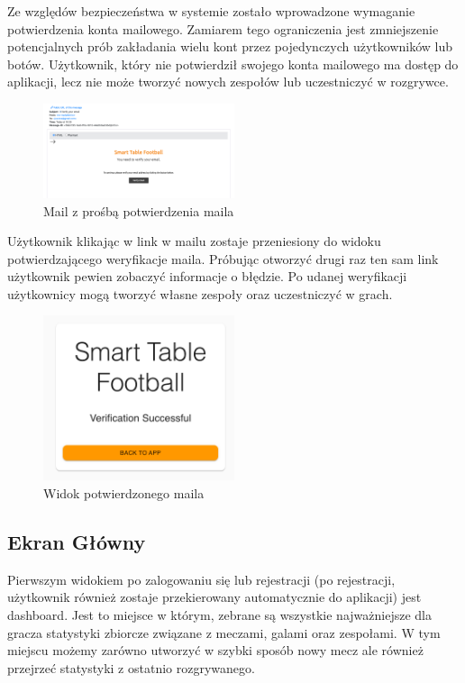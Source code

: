 Ze względów bezpieczeństwa w systemie zostało wprowadzone wymaganie potwierdzenia konta mailowego. Zamiarem tego ograniczenia jest zmniejszenie potencjalnych prób zakładania wielu kont przez pojedynczych użytkowników lub botów. Użytkownik, który nie potwierdził swojego konta mailowego ma dostęp do aplikacji, lecz nie może tworzyć nowych zespołów lub uczestniczyć w rozgrywce.

\begin{figure}[h!]
  \centering
    \includegraphics[width=0.5\textwidth]{images/api/verify_email.png}
  \caption{Mail z prośbą potwierdzenia maila}
  \label{fig:mobile}
\end{figure}

Użytkownik klikając w link w mailu zostaje przeniesiony do widoku potwierdzającego weryfikacje maila. Próbując otworzyć drugi raz ten sam link użytkownik pewien zobaczyć informacje o błędzie. Po udanej weryfikacji użytkownicy mogą tworzyć własne zespoły oraz uczestniczyć w grach.

\begin{figure}[h!]
  \centering
    \includegraphics[width=0.5\textwidth]{images/player/verfied_emial_confirmation.png}
  \caption{Widok potwierdzonego maila}
  \label{fig:mobile}
\end{figure}

\subsection{Ekran Główny}

Pierwszym widokiem po zalogowaniu się lub rejestracji (po rejestracji, użytkownik również zostaje przekierowany automatycznie do aplikacji) jest dashboard. Jest to miejsce w którym, zebrane są wszystkie najważniejsze dla gracza statystyki zbiorcze związane z meczami, galami oraz zespołami. W tym miejscu możemy zarówno utworzyć w szybki sposób nowy mecz ale również przejrzeć statystyki z ostatnio rozgrywanego.

